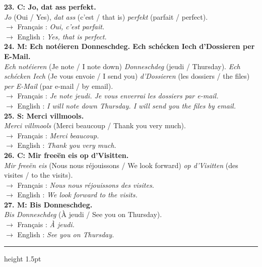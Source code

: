 \noindent\textbf{23. C: Jo, dat ass perfekt.}\\
\textit{Jo} (Oui / Yes), \textit{dat ass} (c'est / that is) \textit{perfekt} (parfait / perfect).\\
$\rightarrow$ Français : \textit{Oui, c'est parfait.}\\
$\rightarrow$ English : \textit{Yes, that is perfect.}\\[0.5em]

\noindent\textbf{24. M: Ech notéieren Donneschdeg. Ech schécken Iech d'Dossieren per E-Mail.}\\
\textit{Ech notéieren} (Je note / I note down) \textit{Donneschdeg} (jeudi / Thursday). \textit{Ech schécken Iech} (Je vous envoie / I send you) \textit{d'Dossieren} (les dossiers / the files) \textit{per E-Mail} (par e-mail / by email).\\
$\rightarrow$ Français : \textit{Je note jeudi. Je vous enverrai les dossiers par e-mail.}\\
$\rightarrow$ English : \textit{I will note down Thursday. I will send you the files by email.}\\[0.5em]

\noindent\textbf{25. S: Merci villmools.}\\
\textit{Merci villmools} (Merci beaucoup / Thank you very much).\\
$\rightarrow$ Français : \textit{Merci beaucoup.}\\
$\rightarrow$ English : \textit{Thank you very much.}\\[0.5em]

\noindent\textbf{26. C: Mir freeën eis op d'Visitten.}\\
\textit{Mir freeën eis} (Nous nous réjouissons / We look forward) \textit{op d'Visitten} (des visites / to the visits).\\
$\rightarrow$ Français : \textit{Nous nous réjouissons des visites.}\\
$\rightarrow$ English : \textit{We look forward to the visits.}\\[0.5em]

\noindent\textbf{27. M: Bis Donneschdeg.}\\
\textit{Bis Donneschdeg} (À jeudi / See you on Thursday).\\
$\rightarrow$ Français : \textit{À jeudi.}\\
$\rightarrow$ English : \textit{See you on Thursday.}

\vspace{1.5cm}
\color{geminiBlue}\hrule height 1.5pt \vspace{0.5em}\color{black}

